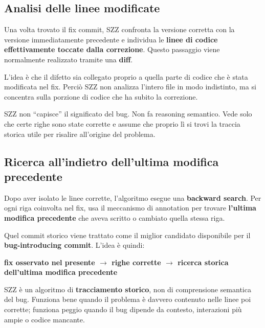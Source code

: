 \subsection{Analisi delle linee modificate}

Una volta trovato il fix commit, SZZ confronta la versione corretta con la versione immediatamente precedente e individua le \textbf{linee di codice effettivamente toccate dalla correzione}. Questo passaggio viene normalmente realizzato tramite una \textbf{diff}.

L'idea è che il difetto sia collegato proprio a quella parte di codice che è stata modificata nel fix. Perciò SZZ non analizza l'intero file in modo indistinto, ma si concentra sulla porzione di codice che ha subito la correzione.

\begin{notaprof}
SZZ non ``capisce'' il significato del bug. Non fa reasoning semantico. Vede solo che certe righe sono state corrette e assume che proprio lì si trovi la traccia storica utile per risalire all'origine del problema.
\end{notaprof}

\subsection{Ricerca all'indietro dell'ultima modifica precedente}

Dopo aver isolato le linee corrette, l'algoritmo esegue una \textbf{backward search}. Per ogni riga coinvolta nel fix, usa il meccanismo di annotation per trovare \textbf{l'ultima modifica precedente} che aveva scritto o cambiato quella stessa riga.

Quel commit storico viene trattato come il miglior candidato disponibile per il \textbf{bug-introducing commit}. L'idea è quindi:

\begin{center}
\textbf{fix osservato nel presente $\rightarrow$ righe corrette $\rightarrow$ ricerca storica dell'ultima modifica precedente}
\end{center}

\begin{notaesame}
SZZ è un algoritmo di \textbf{tracciamento storico}, non di comprensione semantica del bug. Funziona bene quando il problema è davvero contenuto nelle linee poi corrette; funziona peggio quando il bug dipende da contesto, interazioni più ampie o codice mancante.
\end{notaesame}

